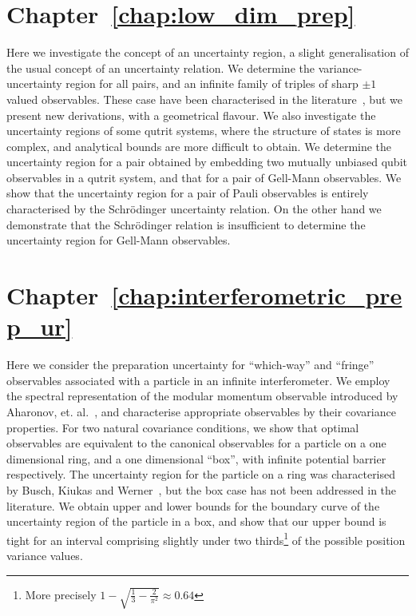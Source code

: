 \section*{Chapter~\ref{chap:low_dim_prep}}

Here we investigate the concept of an uncertainty region, a slight generalisation of the usual concept of an uncertainty relation. We determine the variance-uncertainty region for all pairs, and an infinite family of triples of sharp $\pm 1$ valued observables. These case have been characterised in the literature~\cites{LiQiao2015}{AbbottAlzieuHallBranciard2016}, but we present new derivations, with a geometrical flavour. We also investigate the uncertainty regions of some qutrit systems, where the structure of states is more complex, and analytical bounds are more difficult to obtain. We determine the uncertainty region for a pair obtained by embedding two mutually unbiased qubit observables in a qutrit system, and that for a pair of Gell-Mann observables. We show that the uncertainty region for a pair of Pauli observables is entirely characterised by the Schr{\"o}dinger uncertainty relation. On the other hand we demonstrate that the Schr{\"o}dinger relation is insufficient to determine the uncertainty region for Gell-Mann observables.

\section*{Chapter~\ref{chap:interferometric_prep_ur}}

Here we consider the preparation uncertainty for ``which-way'' and ``fringe'' observables associated with a particle in an infinite interferometer. We employ the spectral representation of the modular momentum observable introduced by Aharonov, et. al.~\cite{aharonov-modular-variables}, and characterise appropriate observables by their covariance properties. For two natural covariance conditions, we show that optimal observables are equivalent to the canonical observables for a particle on a one dimensional ring, and a one dimensional ``box'', with infinite potential barrier respectively. The uncertainty region for the particle on a ring was characterised by Busch, Kiukas and Werner~\cite{sharp-ur-num-angle}, but the box case has not been addressed in the literature. We obtain upper and lower bounds for the boundary curve of the uncertainty region of the particle in a box, and show that our upper bound is tight for an interval comprising slightly under two thirds\footnote{More precisely $1 - \sqrt{\frac{1}{3} - \frac{2}{\pi^2}} \approx 0.64$} of the possible position variance values.

